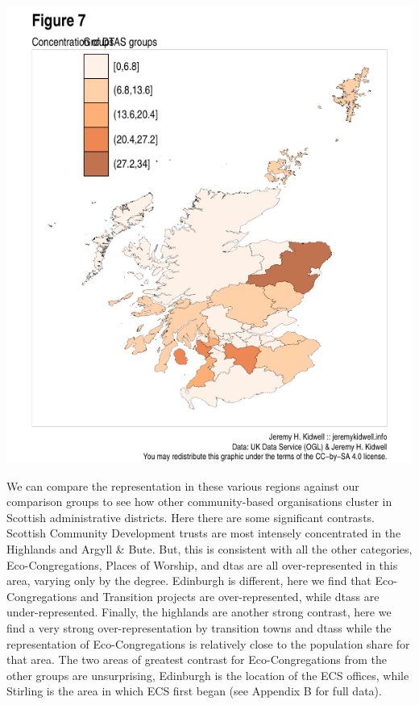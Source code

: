\documentclass[11pt,]{article}
\begin{document}
\includegraphics{figures/create_choropleth_others-3.pdf}

We can compare the representation in these various regions against our
comparison groups to see how other community-based organisations cluster
in Scottish administrative districts. Here there are some significant
contrasts. Scottish Community Development trusts are most intensely
concentrated in the Highlands and Argyll \& Bute. But, this is
consistent with all the other categories, Eco-Congregations, Places of
Worship, and dtas are all over-represented in this area, varying only by
the degree. Edinburgh is different, here we find that Eco-Congregations
and Transition projects are over-represented, while dtass are
under-represented. Finally, the highlands are another strong contrast,
here we find a very strong over-representation by transition towns and
dtass while the representation of Eco-Congregations is relatively close
to the population share for that area. The two areas of greatest
contrast for Eco-Congregations from the other groups are unsurprising,
Edinburgh is the location of the ECS offices, while Stirling is the area
in which ECS first began (see Appendix B for full data).
\end{document}
